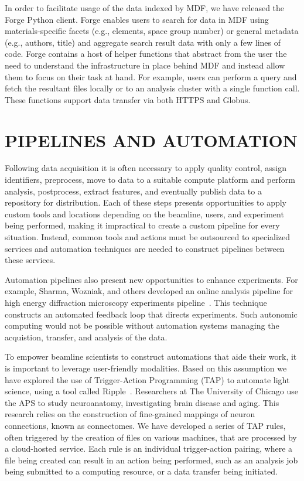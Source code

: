 \documentclass{aip-cp}
\newcommand\ryan[1]{}
\newcommand\ryan[1]{{\color{green}[Ryan: #1]}}
\begin{document}
In order to facilitate usage of the data indexed by MDF, we have released the
Forge Python client. Forge enables users to search for data in MDF using
materials-specific facets (e.g., elements, space group number) or general
metadata (e.g., authors, title) and aggregate search result data with only a
few lines of code. Forge contains a host of helper functions that
abstract from the user the need to understand the infrastructure in place
behind MDF and instead allow them to focus on their task at hand. For example,
users can perform a query and fetch the resultant files locally or to an
analysis cluster with a single function call. These functions support data
transfer via both HTTPS and Globus.



\section{PIPELINES AND AUTOMATION}
\ryan{Making this an automation section. }

Following data acquisition it is often necessary to apply quality control, assign identifiers, 
preprocess, move to data to a suitable compute platform and perform analysis, postprocess, extract 
features, and eventually publish data to a repository for distribution. Each of these steps 
presents opportunities to apply custom tools and locations depending on the beamline, users, and 
experiment being performed, making it impractical to create a custom pipeline for every 
situation. Instead, common tools and actions must be outsourced to specialized services and 
automation techniques are needed to construct pipelines between these services.

Automation pipelines also present new opportunities to enhance experiments. For example, Sharma, 
Wozniak, and others developed an online analysis pipeline for high energy diffraction microscopy 
experiments pipeline~\cite{wozniak2015big}. This technique constructs an automated feedback loop 
that directs experiments. Such autonomic computing would not be possible without automation systems 
managing the acquistion, transfer, and analysis of the data.


To empower beamline scientists to construct automations that aide their work, it is important to 
leverage user-friendly modalities. Based on this assumption we have explored the use of 
Trigger-Action Programming (TAP) to automate light science, using a tool called 
Ripple~\cite{ripple}. Researchers at The University of Chicago use the APS to study neuroanatomy, 
investigating brain disease and aging. This research relies on the construction of 
fine-grained mappings of neuron connections, known as connectomes. 
We have developed a series of TAP rules, often triggered by the creation of files on various 
machines, that are processed by a cloud-hosted service. Each rule is an individual trigger-action 
pairing, where a file being created can result in an action being performed, such as an 
analysis job being submitted to a computing resource, or a data transfer being initiated.
\end{document}
